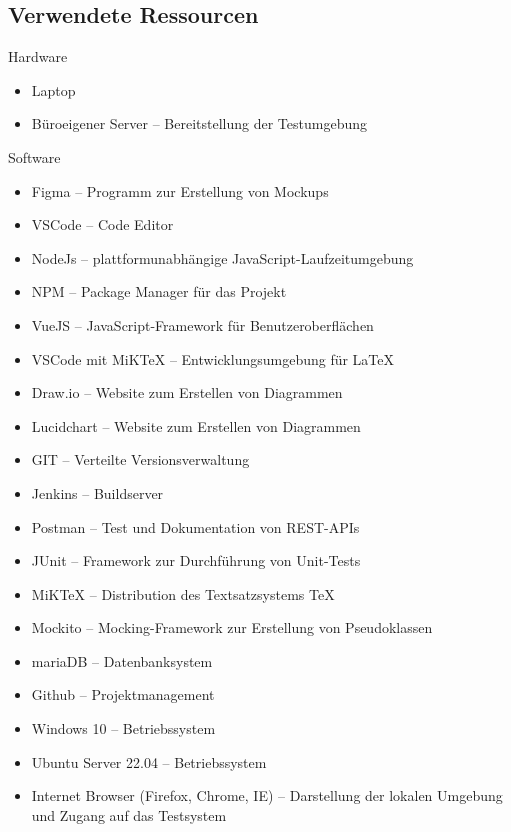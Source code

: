 \clearpage



\subsection{Verwendete Ressourcen}\label{appendix:a3}\par
 Hardware
	\begin{itemize}
		\item Laptop
		\item Büroeigener Server – Bereitstellung der Testumgebung
	\end{itemize}

Software
	\begin{itemize}
		\item Figma -- Programm zur Erstellung von Mockups
		\item \acs{VSCode} -- Code Editor
		\item NodeJs -- plattformunabhängige JavaScript-Laufzeitumgebung
		\item \acs{NPM} – Package Manager für das Projekt
		\item VueJS -- JavaScript-Framework für Benutzeroberflächen
		\item \acs{VSCode} mit \acs{MiKTeX} -- Entwicklungsumgebung für \LaTeX
		\item Draw.io – Website zum Erstellen von Diagrammen
		\item Lucidchart – Website zum Erstellen von Diagrammen
		\item \acs{GIT} -- Verteilte Versionsverwaltung
		\item Jenkins -- Buildserver
		\item Postman -- Test und Dokumentation von \acs{REST-API}s
		\item JUnit -- Framework zur Durchführung von Unit-Tests
		\item \acs{MiKTeX} -- Distribution des Textsatzsystems \TeX
		\item Mockito -- Mocking-Framework zur Erstellung von Pseudoklassen
		\item \acs{mariaDB} -- Datenbanksystem
		\item Github -- Projektmanagement
		\item Windows 10 -- Betriebssystem
		\item Ubuntu Server 22.04 -- Betriebssystem
		\item Internet Browser (Firefox, Chrome, IE) – Darstellung der lokalen Umgebung und Zugang
	auf das Testsystem
	\end{itemize}

